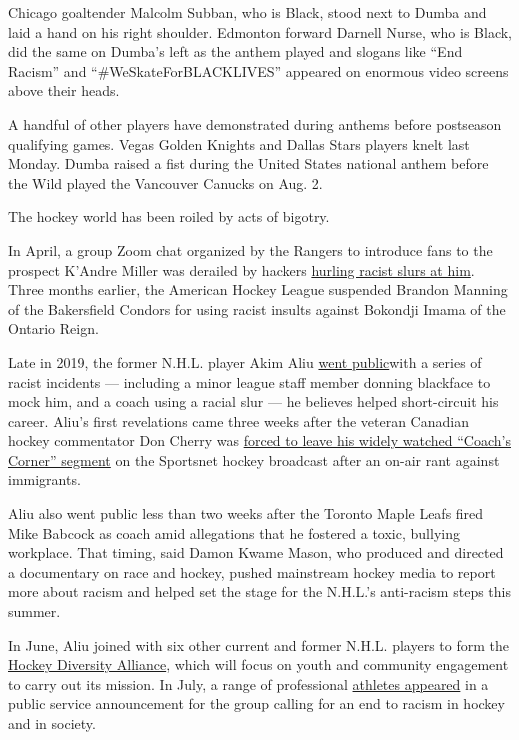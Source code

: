 Chicago goaltender Malcolm Subban, who is Black, stood next to Dumba and
laid a hand on his right shoulder. Edmonton forward Darnell Nurse, who
is Black, did the same on Dumba's left as the anthem played and slogans
like ``End Racism'' and ``\#WeSkateForBLACKLIVES'' appeared on enormous
video screens above their heads.

A handful of other players have demonstrated during anthems before
postseason qualifying games. Vegas Golden Knights and Dallas Stars
players knelt last Monday. Dumba raised a fist during the United States
national anthem before the Wild played the Vancouver Canucks on Aug. 2.

The hockey world has been roiled by acts of bigotry.

In April, a group Zoom chat organized by the Rangers to introduce fans
to the prospect K'Andre Miller was derailed by hackers
\href{https://www.nytimes3xbfgragh.onion/2020/04/03/sports/hockey/03rangers-racism-kandre-miller.html}{hurling
racist slurs at him}. Three months earlier, the American Hockey League
suspended Brandon Manning of the Bakersfield Condors for using racist
insults against Bokondji Imama of the Ontario Reign.

Late in 2019, the former N.H.L. player Akim Aliu
\href{https://www.nytimes3xbfgragh.onion/2020/05/23/sports/hockey/akim-aliu-nhl-racism.html?action=click\&module=RelatedLinks\&pgtype=Article}{went
public}with a series of racist incidents --- including a minor league
staff member donning blackface to mock him, and a coach using a racial
slur --- he believes helped short-circuit his career. Aliu's first
revelations came three weeks after the veteran Canadian hockey
commentator Don Cherry was
\href{https://www.nytimes3xbfgragh.onion/2019/11/11/sports/don-cherry.html}{forced
to leave his widely watched ``Coach's Corner'' segment} on the Sportsnet
hockey broadcast after an on-air rant against immigrants.

Aliu also went public less than two weeks after the Toronto Maple Leafs
fired Mike Babcock as coach amid allegations that he fostered a toxic,
bullying workplace. That timing, said Damon Kwame Mason, who produced
and directed a documentary on race and hockey, pushed mainstream hockey
media to report more about racism and helped set the stage for the
N.H.L.'s anti-racism steps this summer.

In June, Aliu joined with six other current and former N.H.L. players to
form the
\href{https://www.nytimes3xbfgragh.onion/2020/06/08/sports/hockey/nhl-hockey-diversity-alliance.html}{Hockey
Diversity Alliance}, which will focus on youth and community engagement
to carry out its mission. In July, a range of professional
\href{https://twitter.com/TheOfficialHDA/status/1288914481456664576?s=20}{athletes
appeared} in a public service announcement for the group calling for an
end to racism in hockey and in society.


